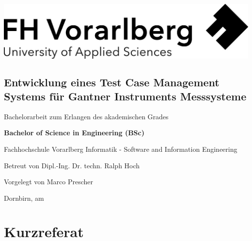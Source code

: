 \documentclass[a4paper, fontsize=11pt, parskip=half, twoside]{scrreprt}
\date{\displaydate{date}}
\begin{document}
	
	\thispagestyle{empty}
	
	\cleardoublepage   %
	\thispagestyle{empty}
	\begin{titlepage}
		\begin{flushright}
			\includegraphics[width=0.4\linewidth]{assets/Logo-A3.jpg}
		\end{flushright}
		
		\begin{flushleft}
			\section*{Entwicklung eines Test Case Management Systems für Gantner Instruments Messsysteme}
			\vspace{1cm}
			
			\vspace{0.5cm}
			Bachelorarbeit\newline
			zum Erlangen des akademischen Grades\newline
			
			\vspace{0.5cm}
			\textbf{Bachelor of Science in Engineering (BSc)}
			
			\vspace{1cm}
			Fachhochschule Vorarlberg\newline
			Informatik - Software and Information Engineering\newline
			
			\vspace{0.5cm}
			Betreut von\newline
			Dipl.-Ing. Dr. techn. Ralph Hoch
			
			\vspace{0.5cm} 
			Vorgelegt von\newline
			Marco Prescher	
			
			\vspace{0.5cm}
			Dornbirn, am 
		\end{flushleft}
	\end{titlepage}
	
	\newpage
	\section*{Kurzreferat}
\end{document}
